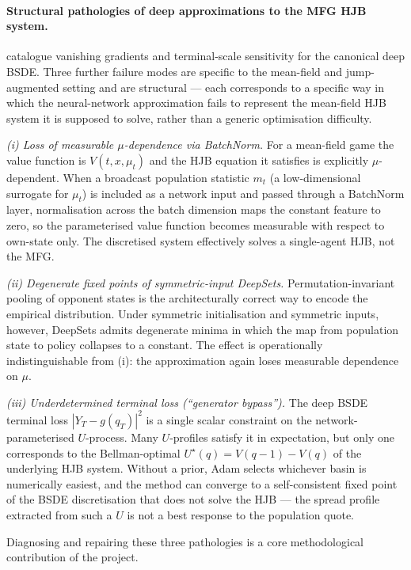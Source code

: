 \documentclass[11pt,a4paper]{article}
\begin{document}
\paragraph{Structural pathologies of deep approximations to the
MFG HJB system.}
\citet{germain2022} catalogue vanishing gradients and terminal-scale
sensitivity for the canonical deep BSDE.  Three further failure
modes are specific to the mean-field and jump-augmented setting
and are structural --- each corresponds to a specific way in
which the neural-network approximation fails to represent the
mean-field HJB system it is supposed to solve, rather than a
generic optimisation difficulty.

\emph{(i) Loss of measurable $\mu$-dependence via BatchNorm.}
For a mean-field game the value function is $V(t, x, \mu_t)$ and
the HJB equation it satisfies is explicitly $\mu$-dependent.  When a
broadcast population statistic $m_t$ (a low-dimensional surrogate
for $\mu_t$) is included as a network input and passed through a
BatchNorm layer, normalisation across the batch dimension maps
the constant feature to zero, so the parameterised value function
becomes measurable with respect to own-state only.  The
discretised system effectively solves a single-agent HJB, not
the MFG.

\emph{(ii) Degenerate fixed points of symmetric-input DeepSets.}
Permutation-invariant pooling of opponent states is the
architecturally correct way to encode the empirical distribution.
Under symmetric initialisation and symmetric inputs, however,
DeepSets admits degenerate minima in which the map from
population state to policy collapses to a constant.  The effect
is operationally indistinguishable from (i): the approximation
again loses measurable dependence on $\mu$.

\emph{(iii) Underdetermined terminal loss (``generator bypass'').}
The deep BSDE terminal loss $|Y_T - g(q_T)|^2$ is a single scalar
constraint on the network-parameterised $U$-process.  Many
$U$-profiles satisfy it in expectation, but only one corresponds
to the Bellman-optimal $U^\star(q) = V(q-1) - V(q)$ of the
underlying HJB system.  Without a prior, Adam selects whichever
basin is numerically easiest, and the method can converge to a
self-consistent fixed point of the BSDE discretisation that does
not solve the HJB --- the spread profile extracted from such a
$U$ is not a best response to the population quote.

Diagnosing and repairing these three pathologies is a core
methodological contribution of the project.
\end{document}
